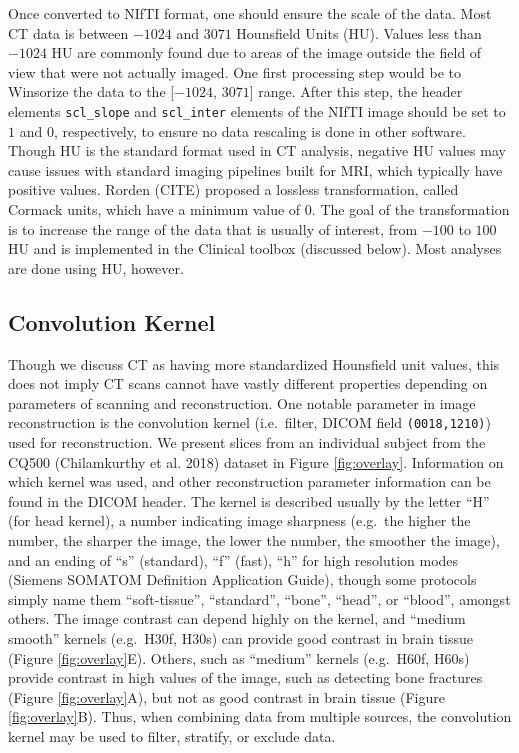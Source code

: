 \documentclass[]{elsarticle} %
\begin{document}
Once converted to NIfTI format, one should ensure the scale of the data. Most CT data is between \(-1024\) and \(3071\) Hounsfield Units (HU). Values less than \(-1024\) HU are commonly found due to areas of the image outside the field of view that were not actually imaged. One first processing step would be to Winsorize the data to the {[}\(-1024\), \(3071\){]} range. After this step, the header elements \texttt{scl\_slope} and \texttt{scl\_inter} elements of the NIfTI image should be set to \(1\) and \(0\), respectively, to ensure no data rescaling is done in other software. Though HU is the standard format used in CT analysis, negative HU values may cause issues with standard imaging pipelines built for MRI, which typically have positive values. Rorden (CITE) proposed a lossless transformation, called Cormack units, which have a minimum value of \(0\). The goal of the transformation is to increase the range of the data that is usually of interest, from \(-100\) to \(100\)HU and is implemented in the Clinical toolbox (discussed below). Most analyses are done using HU, however.

\hypertarget{convolution-kernel}{%
\subsection{Convolution Kernel}\label{convolution-kernel}}

Though we discuss CT as having more standardized Hounsfield unit values, this does not imply CT scans cannot have vastly different properties depending on parameters of scanning and reconstruction. One notable parameter in image reconstruction is the convolution kernel (i.e.~filter, DICOM field \texttt{(0018,1210)}) used for reconstruction. We present slices from an individual subject from the CQ500 (Chilamkurthy et al. 2018) dataset in Figure \ref{fig:overlay}. Information on which kernel was used, and other reconstruction parameter information can be found in the DICOM header. The kernel is described usually by the letter ``H'' (for head kernel), a number indicating image sharpness (e.g.~the higher the number, the sharper the image, the lower the number, the smoother the image), and an ending of ``s'' (standard), ``f'' (fast), ``h'' for high resolution modes (Siemens SOMATOM Definition Application Guide),
though some protocols simply name them ``soft-tissue'', ``standard'', ``bone'', ``head'', or ``blood'', amongst others. The image contrast can depend highly on the kernel, and ``medium smooth'' kernels (e.g.~H30f, H30s) can provide good contrast in brain tissue (Figure \ref{fig:overlay}E). Others, such as ``medium'' kernels (e.g.~H60f, H60s) provide contrast in high values of the image, such as detecting bone fractures (Figure \ref{fig:overlay}A), but not as good contrast in brain tissue (Figure \ref{fig:overlay}B). Thus, when combining data from multiple sources, the convolution kernel may be used to filter, stratify, or exclude data.
\end{document}
